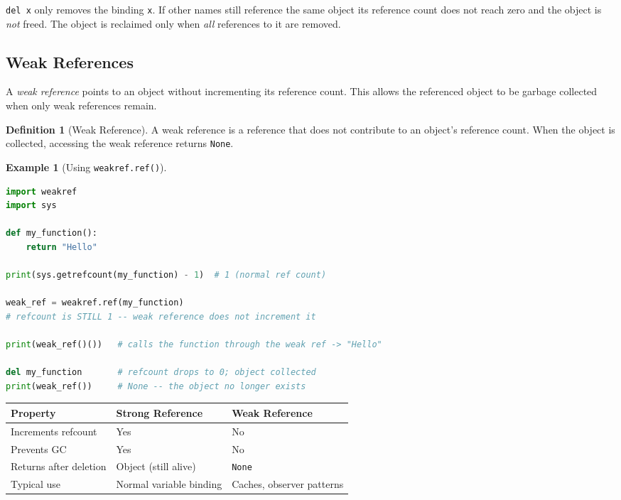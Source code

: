\documentclass[11pt, a4paper, notitlepage]{report}
\theoremstyle{definition}
\newtheorem{definition}[theorem]{Definition}
\theoremstyle{remark}
\theoremstyle{definition}
\newtheorem{example}[theorem]{Example}
\begin{document}
\begin{warning}[title={Warning: \texttt{del} Removes the Name, Not Necessarily the Object}]
\texttt{del x} only removes the binding \texttt{x}. If other names still reference the same
object its reference count does not reach zero and the object is \emph{not} freed. The object
is reclaimed only when \emph{all} references to it are removed.
\end{warning}

\subsection{Weak References}
\label{subsec:weakref}

A \emph{weak reference} points to an object without incrementing its reference count. This
allows the referenced object to be garbage collected when only weak references remain.

\begin{definition}[Weak Reference]
A weak reference is a reference that does not contribute to an object's reference count. When
the object is collected, accessing the weak reference returns \texttt{None}.
\end{definition}

\begin{example}[Using \texttt{weakref.ref()}]
\leavevmode
\begin{lstlisting}[language=Python]
import weakref
import sys

def my_function():
    return "Hello"

print(sys.getrefcount(my_function) - 1)  # 1 (normal ref count)

weak_ref = weakref.ref(my_function)
# refcount is STILL 1 -- weak reference does not increment it

print(weak_ref()())   # calls the function through the weak ref -> "Hello"

del my_function       # refcount drops to 0; object collected
print(weak_ref())     # None -- the object no longer exists
\end{lstlisting}
\end{example}

\begin{keyresult}[title={Key Result: Strong vs.\ Weak References}]
\begin{center}
\begin{tabularx}{\linewidth}{@{}l X l@{}}
\toprule
\textbf{Property} & \textbf{Strong Reference} & \textbf{Weak Reference} \\
\midrule
Increments refcount & Yes & No \\
Prevents GC & Yes & No \\
Returns after deletion & Object (still alive) & \texttt{None} \\
Typical use & Normal variable binding & Caches, observer patterns \\
\bottomrule
\end{tabularx}
\end{center}
\end{keyresult}
\end{document}
